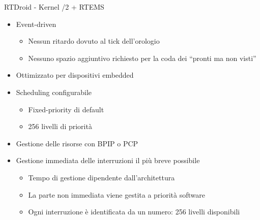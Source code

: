 \begin{frame}{RTDroid - Kernel /2}
	+ RTEMS
	\begin{itemize}
		\item Event-driven
		\begin{itemize}
			\item Nessun ritardo dovuto al tick dell'orologio
			\item Nessuno spazio aggiuntivo richiesto per la coda dei ``pronti ma non visti''
		\end{itemize}
		\item Ottimizzato per dispositivi embedded
		\item Scheduling configurabile
		\begin{itemize}
			\item Fixed-priority di default
			\item 256 livelli di priorità
		\end{itemize}
		\item Gestione delle risorse con BPIP o PCP
		\item Gestione immediata delle interruzioni il più breve possibile
		\begin{itemize}
			\item Tempo di gestione dipendente dall'architettura
			\item La parte non immediata viene gestita a priorità software
			\item Ogni interruzione è identificata da un numero: 256 livelli disponibili
		\end{itemize}
	\end{itemize}
\end{frame}